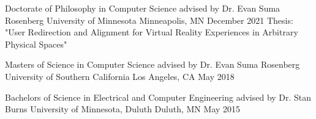 
\begin{cventries}
  \cventry
    {Doctorate of Philosophy in Computer Science advised by Dr. Evan Suma Rosenberg}%
    {University of Minnesota} %
    {Minneapolis, MN} %
    {December 2021} %
    {Thesis: "User Redirection and Alignment for Virtual Reality Experiences in Arbitrary Physical Spaces"}

  \cventry
    {Masters of Science in Computer Science advised by Dr. Evan Suma Rosenberg} %
    {University of Southern California} %
    {Los Angeles, CA} %
    {May 2018} %
    {}
  
  \vspace{-.5cm} 
  \cventry
    {Bachelors of Science in Electrical and Computer Engineering advised by Dr. Stan Burns} %
    {University of Minnesota, Duluth} %
    {Duluth, MN} %
    {May 2015} %
    {}
  \vspace{-.5cm} 
\end{cventries}
